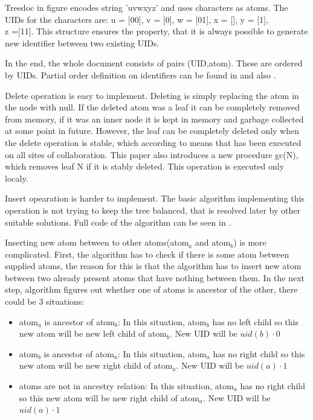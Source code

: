\documentclass[12pt,oneside]{fithesis2}
\begin{document}
\par Treedoc in figure encodes string 'uvwxyz' and uses characters as atoms. The UIDs for the characters are: u = [00], v = [0], w = [01], x = [], y = [1],\\z =[11]. This structure ensures the property, that it is always possible to generate new identifier between two existing UIDs. 
\par In the end, the whole document consists of pairs (UID,atom). These are ordered by UIDs. Partial order definition on identifiers can be found in \cite{Shapiro-design} and also \cite{Shapiro-editing}. 
\par Delete operation is easy to implement. Deleting is simply replacing the atom in the node with null. If the deleted atom was a leaf it can be completely removed from memory, if it was an inner node it is kept in memory and garbage collected at some point in future. However, the leaf can be completely deleted only when the delete operation is stable, which according to \cite{Shapiro-design} means that has been executed on all sites of collaboration. This paper also introduces a new procedure gc(N), which removes leaf N if it is stably deleted. This operation is executed only localy.
\par Insert opearation is harder to implement. The basic algorithm implementing this operation is not trying to keep the tree balanced, that is resolved later by other suitable solutions. Full code of the algorithm can be seen in \cite{Shapiro-design} \cite{Shapiro-editing}. 
\par Inserting new atom between to other atoms(atom\(_a\) and atom\(_b\)) is more complicated. First, the algorithm has to check if there is some atom between supplied atoms, the reason for this is that the algorithm has to insert new atom between two already present atoms that have nothing between them.
In the next step, algorithm figures out whether one of atoms is ancestor of the other, there could be 3 situations:
\begin{itemize}
\item atom\(_a\) is ancestor of atom\(_b\): In this situation, atom\(_b\) has no left child so this new atom will be new left child of atom\(_b\). New UID will be \(uid(b) \cdot 0\)
\item atom\(_b\) is ancestor of atom\(_a\): In this situation, atom\(_a\) has no right child so this new atom will be new right child of atom\(_a\). New UID will be \(uid(a) \cdot 1\)
\item atoms are not in ancestry relation:  In this situation, atom\(_a\) has no right child so this new atom will be new right child of atom\(_a\). New UID will be \(uid(a) \cdot 1\)
\end{itemize}
\end{document}
